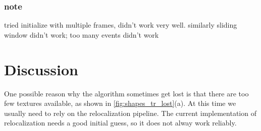 \subsection{note}
\label{sec:note}

tried initialize with multiple frames, didn't work very
well. similarly sliding window didn't work; too many events didn't
work

\chapter{Discussion}
\label{chap:discussion}
One possible reason why the algorithm sometimes get lost is that there
are too few textures available, as shown in
\cref{fig:shapes_tr_lost}(a). At this time we usually need to rely on
the relocalization pipeline. The current implementation of
relocalization needs a good initial guess, so it does not alway work
reliably.
